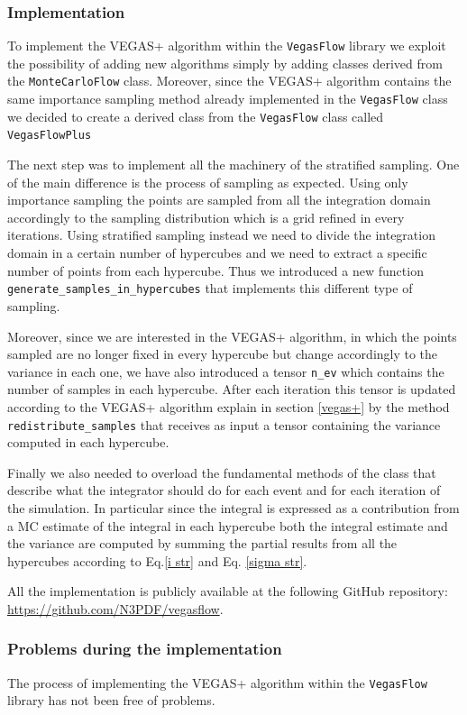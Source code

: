 \documentclass[../main/main.tex]{subfiles}
\begin{document}
\subsubsection{Implementation}
To implement the VEGAS+ algorithm within the \texttt{VegasFlow} library we exploit the possibility of adding new algorithms simply by
adding classes derived from the \texttt{MonteCarloFlow} class. Moreover, since the VEGAS+ algorithm contains the same importance sampling method already implemented in the \texttt{VegasFlow} class we decided to create a derived class from the \texttt{VegasFlow} class called \texttt{VegasFlowPlus}

The next step was to implement all the machinery of the stratified sampling. 
One of the main difference is the process of sampling as expected. Using only importance sampling the points are sampled from all the integration domain accordingly to the sampling distribution which is a grid refined in every iterations. Using stratified sampling instead we need to divide the integration domain in a certain number of hypercubes and we need to extract a specific number of points from each hypercube. 
Thus we introduced a new function \texttt{generate\_samples\_in\_hypercubes} that implements this different type of sampling.

Moreover, since we are interested in the VEGAS+ algorithm, in which the points sampled are no longer fixed in every hypercube but change accordingly to the variance in each one, we have also introduced a tensor \texttt{n\_ev} which contains the number of samples in each hypercube. 
After each iteration this tensor is updated according to the VEGAS+ algorithm explain in section \ref{vegas+} by the method \texttt{redistribute\_samples} that receives as input a tensor containing the variance computed in each hypercube.

Finally we also needed to overload the fundamental methods of the class that describe what the integrator should do for each event and for each iteration of the simulation. In particular since the integral is expressed as a contribution from a MC estimate of the integral in each hypercube both the integral estimate and the variance are computed by summing the partial results from all the hypercubes according to Eq.\eqref{i str} and Eq. \eqref{sigma str}.

All the implementation is publicly available at the following GitHub repository: \url{https://github.com/N3PDF/vegasflow}.
\subsubsection{Problems during the implementation}
\label{vfp problem}
The process of implementing the VEGAS+ algorithm within the \texttt{VegasFlow} library has not been free of problems.
\end{document}
